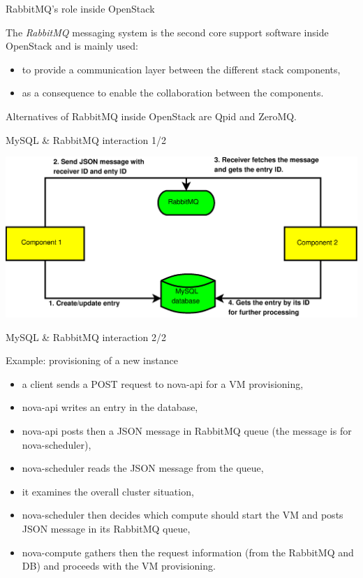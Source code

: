 \documentclass[english,serif,mathserif]{beamer}
\begin{document}
\begin{frame}{RabbitMQ's role inside OpenStack}

The \textit{RabbitMQ} messaging system is the second core support software 
inside OpenStack and is mainly used:

\begin{itemize}
\item to provide a communication layer between the different stack components, 
\item as a consequence to enable the collaboration between the components.
\end{itemize} 

Alternatives of RabbitMQ inside OpenStack are Qpid and ZeroMQ.

\end{frame}
\begin{frame}{MySQL \& RabbitMQ interaction 1/2}

\includegraphics[scale=0.37]{db-rabbitmq.eps}

\end{frame}
\begin{frame}{MySQL \& RabbitMQ interaction 2/2}

Example: provisioning of a new instance

\begin{itemize}
\item a client sends a POST request to nova-api for a VM provisioning,
\item nova-api writes an entry in the database,
\item nova-api posts then a JSON message in RabbitMQ queue (the message is for nova-scheduler),
\item nova-scheduler reads the JSON message from the queue,
\item it examines the overall cluster situation,
\item nova-scheduler then decides which compute should start the VM and posts JSON message in its RabbitMQ queue,
\item nova-compute gathers then the request information (from the RabbitMQ and DB) and proceeds with the VM provisioning.
\end{itemize}

\end{frame}
\end{document}
